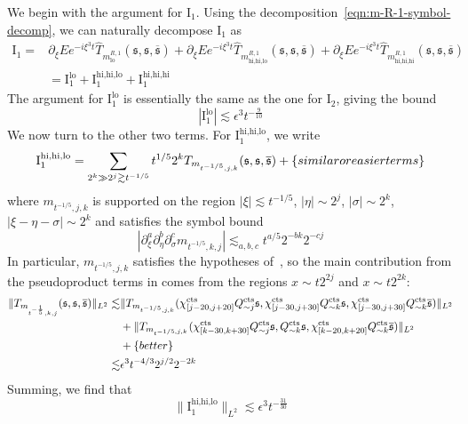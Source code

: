 \documentclass[letterpaper, reqno,final]{amsart}
\newcommand{\fs}{\mathfrak{s}}
\newcommand{\rmI}{\mathrm{I}}
\newcommand{\tcts}{\text{cts}}
\newcommand{\btext}[1]{\left\{\textup{#1}\right\}}
\newcommand{\bbetter}{\btext{better}}
\newcommand{\bsime}{\btext{similar or easier terms}}
\begin{document}
We begin with the argument for $\rmI_1$.  Using the decomposition~\eqref{eqn:m-R-1-symbol-decomp}, we can naturally decompose $\rmI_1$ as
\begin{equation*}\begin{split}
    \rmI_1 =& \partial_\xi E e^{-i\xi^3t} \hat{T}_{m^{R,1}_{\text{lo}}}(\fs, \fs, \overline{\fs}) + \partial_\xi E e^{-i\xi^3t} \hat{T}_{m^{R,1}_{\text{hi,hi,lo}}}(\fs, \fs, \overline{\fs}) + \partial_\xi E e^{-i\xi^3t} \hat{T}_{m^{R,1}_{\text{hi,hi,hi}}}(\fs, \fs, \overline{\fs})\\
    &= \rmI_1^{\text{lo}} + \rmI_1^{\text{hi,hi,lo}} + \rmI_1^{\text{hi,hi,hi}}
\end{split}\end{equation*}
The argument for $\rmI_1^{\text{lo}}$ is essentially the same as the one for $\rmI_2$, giving the bound
\begin{equation*}
    |\rmI_1^\text{lo}| \lesssim \epsilon^3 t^{-\frac{9}{10}}
\end{equation*}
We now turn to the other two terms.  For $\rmI_1^{\text{hi,hi,lo}}$, we write
\begin{equation*}
    \rmI_1^{\text{hi,hi,lo}} = \sum_{2^k \gg 2^j \gtrsim t^{-1/5}} t^{1/5} 2^k T_{m_{t^{-1/5}, j,k}}(\fs, \fs, \overline{\fs}) + \bsime
\end{equation*}
where $m_{t^{-1/5}, j, k}$ is supported on the region $|\xi| \lesssim t^{-1/5}$, $|\eta| \sim 2^j$, $|\sigma| \sim 2^k$, $|\xi - \eta - \sigma| \sim 2^k$ and satisfies the symbol bound
\begin{equation*}
    |\partial_\xi^a \partial_\eta^b \partial_\sigma^c m_{t^{-1/5}, k, j}| \lesssim_{a,b,c} t^{a/5} 2^{-bk} 2^{-cj}
\end{equation*}
In particular, $ m_{t^{-1/5}, j, k}$ satisfies the hypotheses of~, so the main contribution from the pseudoproduct terms in comes from the regions $x \sim t 2^{2j}$ and $x \sim t 2^{2k}$:
\begin{equation*}\label{eqn:T-m-t-1-5-k-j-est}
\begin{split}
    \lVert T_{m_{t^{-\frac{1}{5}}, k, j}}(\fs, \fs, \overline{\fs}) \rVert_{L^{2}} \lesssim& \lVert T_{m_{t^{-1/5}, j, k}}(\chi_{[j-20,j+20]}^\tcts Q^\tcts_{\sim j}\fs, \chi_{[j-30,j+30]}^\tcts Q^\tcts_{\sim k}\fs, \chi_{[j-30,j+30]}^\tcts Q^\tcts_{\sim k}\overline{\fs}) \rVert_{L^{2}}\\
    &+  \lVert T_{m_{t^{-1/5, j, k}}}(\chi_{[k - 30, k+30]}^\tcts Q^\tcts_{\sim j}\fs, Q^\tcts_{\sim k} \fs, \chi_{[k - 20, k+20]}^\tcts Q^\tcts_{\sim k}\overline{\fs}) \rVert_{L^2}\\
    &+ \bbetter\\
    \lesssim& \epsilon^3 t^{-4/3} 2^{j/2}2^{-2k}
\end{split}\end{equation*}
Summing, we find that
\begin{equation*}
    \lVert \rmI_1^{\text{hi,hi,lo}} \rVert_{L^2} \lesssim \epsilon^3 t^{-\frac{31}{30}}
\end{equation*}
\end{document}
